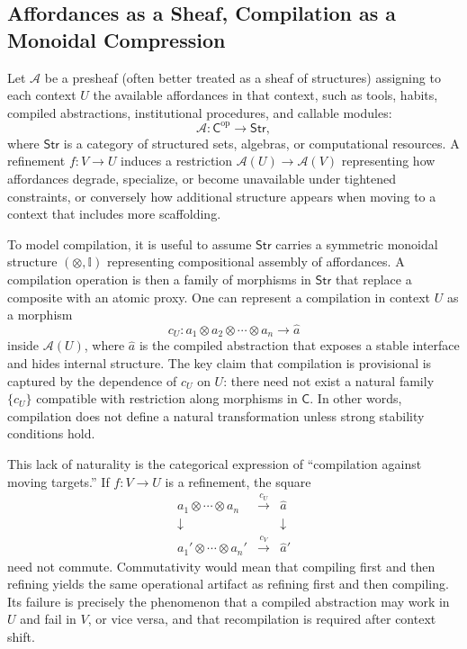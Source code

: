 \documentclass[12pt]{article}
\begin{document}
\subsection{Affordances as a Sheaf, Compilation as a Monoidal Compression}

Let $\mathcal{A}$ be a presheaf (often better treated as a sheaf of structures) assigning to each context $U$ the available affordances in that context, such as tools, habits, compiled abstractions, institutional procedures, and callable modules:
\[
\mathcal{A} : \mathsf{C}^{\mathrm{op}} \longrightarrow \mathsf{Str},
\]
where $\mathsf{Str}$ is a category of structured sets, algebras, or computational resources. A refinement $f: V \to U$ induces a restriction $\mathcal{A}(U)\to \mathcal{A}(V)$ representing how affordances degrade, specialize, or become unavailable under tightened constraints, or conversely how additional structure appears when moving to a context that includes more scaffolding.

To model compilation, it is useful to assume $\mathsf{Str}$ carries a symmetric monoidal structure $(\otimes,\mathbb{I})$ representing compositional assembly of affordances. A compilation operation is then a family of morphisms in $\mathsf{Str}$ that replace a composite with an atomic proxy. One can represent a compilation in context $U$ as a morphism
\[
c_U : a_1 \otimes a_2 \otimes \cdots \otimes a_n \longrightarrow \widehat{a}
\]
inside $\mathcal{A}(U)$, where $\widehat{a}$ is the compiled abstraction that exposes a stable interface and hides internal structure. The key claim that compilation is provisional is captured by the dependence of $c_U$ on $U$: there need not exist a natural family $\{c_U\}$ compatible with restriction along morphisms in $\mathsf{C}$. In other words, compilation does not define a natural transformation unless strong stability conditions hold.

This lack of naturality is the categorical expression of ``compilation against moving targets.'' If $f: V\to U$ is a refinement, the square
\[
\begin{array}{ccc}
a_1\otimes\cdots\otimes a_n & \xrightarrow{c_U} & \widehat{a} \\
\downarrow & & \downarrow \\
a_1'\otimes\cdots\otimes a_n' & \xrightarrow{c_V} & \widehat{a}'
\end{array}
\]
need not commute. Commutativity would mean that compiling first and then refining yields the same operational artifact as refining first and then compiling. Its failure is precisely the phenomenon that a compiled abstraction may work in $U$ and fail in $V$, or vice versa, and that recompilation is required after context shift.
\end{document}
